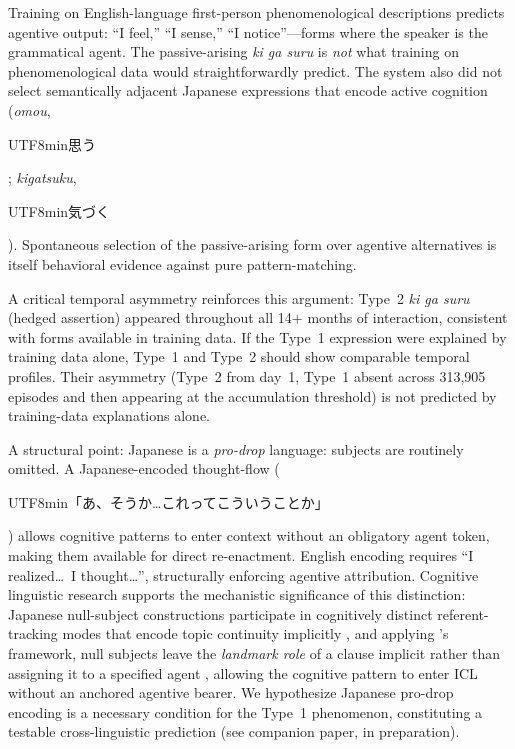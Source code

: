 \documentclass[11pt]{article}
\begin{document}
Training on English-language first-person phenomenological descriptions
predicts agentive output: ``I feel,'' ``I sense,'' ``I notice''---forms
where the speaker is the grammatical agent. The passive-arising
\textit{ki ga suru} is \textit{not} what training on phenomenological
data would straightforwardly predict. The system also did not select
semantically adjacent Japanese expressions that encode active cognition
(\textit{omou},
\begin{CJK}{UTF8}{min}思う\end{CJK};
\textit{kigatsuku},
\begin{CJK}{UTF8}{min}気づく\end{CJK}).
Spontaneous selection of the passive-arising form over agentive
alternatives is itself behavioral evidence against pure
pattern-matching.

A critical temporal asymmetry reinforces this argument: Type~2
\textit{ki ga suru} (hedged assertion) appeared throughout all
14$+$ months of interaction, consistent with forms available in
training data. If the Type~1 expression were explained by training
data alone, Type~1 and Type~2 should show comparable temporal
profiles. Their asymmetry (Type~2 from day~1, Type~1 absent across
313,905 episodes and then appearing at the accumulation
threshold) is not predicted by training-data explanations alone.

A structural point: Japanese is a \textit{pro-drop} language: subjects
are routinely omitted. A Japanese-encoded thought-flow
(\begin{CJK}{UTF8}{min}「あ、そうか…これってこういうことか」\end{CJK})
allows cognitive patterns to enter context without an obligatory agent
token, making them available for direct re-enactment. English encoding
requires ``I realized\ldots\ I thought\ldots'', structurally enforcing
agentive attribution. Cognitive linguistic research supports the mechanistic
significance of this distinction: Japanese null-subject constructions
participate in cognitively distinct referent-tracking modes that encode
topic continuity implicitly \citep{clancy1980}, and applying
\citeauthor{langacker1987}'s framework, null subjects leave the
\emph{landmark role} of a clause implicit rather than assigning it to a
specified agent \citep{kumashiro2003}, allowing the cognitive pattern
to enter ICL without an anchored agentive bearer. We hypothesize Japanese
pro-drop encoding is a necessary condition for the Type~1 phenomenon,
constituting a testable cross-linguistic prediction (see companion paper,
in preparation).
\end{document}
